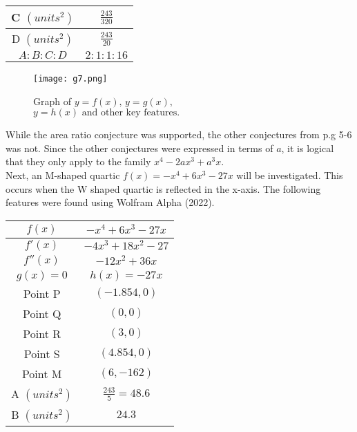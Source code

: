 \documentclass{homework}
\begin{document}
\begin{flushleft}
\begin{paracol}{2}
\begin{tabular}{|c|c|}
        C $(units^2)$ & $\frac{243}{320}$  \\ \hline
        D $(units^2)$ & $\frac{243}{20}$ \\ \hline
        $A:B:C:D$  & $2:1:1:16$ \\ \hline
        \end{tabular}
        \endgroup
    \switchcolumn
       \begin{figure}[htp]
            \centering
            \texttt{[image: g7.png]} \\
            \caption{Graph of $y=f(x),\, y=g(x),$\\ $y=h(x) \text{ and other key features.}$}
            \label{fig:g7}
        \end{figure}
    \end{paracol}
\vspace{1em}
    While the area ratio conjecture was supported, the other conjectures from p.g 5-6 was not. Since the other conjectures were expressed in terms of $a$, it is logical that they only apply to the family $x^4-2ax^3+a^3x$. \vspace{0.8em}\\
    Next, an M-shaped quartic $f(x)=-x^{4}+6x^{3}-27x$ will be investigated. This occurs when the W shaped quartic is reflected in the x-axis. The following features were found using Wolfram Alpha (2022).
    \vspace{1em}\\
\begin{paracol}{2}
    \begingroup
    \setlength{\tabcolsep}{1.7em}
    \renewcommand{\arraystretch}{1.4}
    \begin{tabular}{|c|c|} \hline
     $f(x)$  & $-x^{4}+6x^{3}-27x $ \\ \hline
     $f'(x)$  & $-4x^3 + 18x^2 - 27 $ \\ \hline
     $f''(x)$  & $-12x^2 + 36x $ \\ \hline
      $g(x)=0 $  & $h(x)=-27x $ \\ \hline
      Point P & $(-1.854,0)$ \\ \hline
      Point Q & $(0, 0)$ \\ \hline
      Point R & $(3, 0)$ \\ \hline
      Point S & $(4.854,0)$ \\ \hline
      Point M & $(6,-162)$ \\ \hline
    A $(units^2)$ & $\frac{243}{5}=48.6$\\ \hline
    B $(units^2)$ & $24.3$ \\ \hline

\end{tabular}
\end{paracol}
\end{flushleft}
\end{document}
